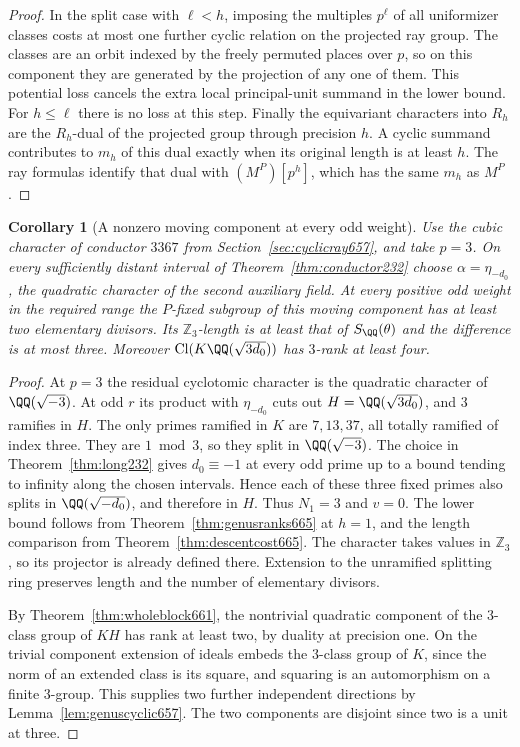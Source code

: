 \documentclass[a4paper,11pt]{article}
\newtheorem{corollary}[proposition]{Corollary}
\theoremstyle{definition}
\theoremstyle{remark}
\newcommand{\ZZ}{\mathbb Z}\newcommand{\ord}{\operatorname{ord}}
\numberwithin{equation}{section}
\newcommand{\Cl}{\operatorname{Cl}}
\begin{document}
\begin{proof}
In the split case with \(\ell<h\), imposing the multiples
\(p^\ell\) of all uniformizer classes costs at most one further
cyclic relation on the projected ray group. The classes are an
orbit indexed by the freely permuted places over \(p\), so on
this component they are generated by the projection of any
one of them. This potential loss cancels the extra local
principal-unit summand in the lower bound. For \(h\le\ell\)
there is no loss at this step. Finally the equivariant
characters into \(R_h\) are the \(R_h\)-dual of the projected
group through precision \(h\). A cyclic summand contributes
to \(m_h\) of this dual exactly when its original length is
at least \(h\). The ray formulas identify that dual with
\((M^P)[p^h]\), which has the same \(m_h\) as \(M^P\).
\end{proof}

\begin{corollary}[A nonzero moving component at every odd weight]
\leavevmode\label{cor:movingcubic665}
Use the cubic character of conductor \(3367\) from
Section~\ref{sec:cyclicray657}, and take \(p=3\).
On every sufficiently distant interval of
Theorem~\ref{thm:conductor232} choose
\(\alpha=\eta_{-d_0}\), the quadratic character of the second
auxiliary field. At every positive odd weight in the required
range the \(P\)-fixed subgroup of this moving component has
at least two elementary divisors. Its \(\ZZ_3\)-length is at
least that of \(S_{\QQ}(\theta)\) and
the difference is at most three. Moreover
\(\Cl(K\QQ(\sqrt{3d_0}))\) has \(3\)-rank at least four.
\end{corollary}
\begin{proof}
At \(p=3\) the residual cyclotomic character is the quadratic
character of \(\QQ(\sqrt{-3})\). At odd \(r\) its product with
\(\eta_{-d_0}\) cuts out \(H=\QQ(\sqrt{3d_0})\), and \(3\)
ramifies in \(H\). The only primes ramified in \(K\) are
\(7,13,37\), all totally ramified of index three. They are
\(1\bmod 3\), so they split in \(\QQ(\sqrt{-3})\).
The choice in Theorem~\ref{thm:long232} gives
\(d_0\equiv-1\) at every odd prime up to a bound tending to
infinity along the chosen intervals. Hence each of these
three fixed primes also splits in \(\QQ(\sqrt{-d_0})\), and
therefore in \(H\). Thus \(N_1=3\) and \(v=0\).
The lower bound follows from Theorem~\ref{thm:genusranks665}
at \(h=1\), and the length comparison from
Theorem~\ref{thm:descentcost665}. The character takes values
in \(\ZZ_3\), so its projector is already defined there.
Extension to the unramified splitting ring preserves length
and the number of elementary divisors.

By Theorem~\ref{thm:wholeblock661}, the nontrivial quadratic
component of the \(3\)-class group of \(KH\) has rank at least
two, by duality at precision one. On the trivial component
extension of ideals embeds the \(3\)-class group of \(K\), since
the norm of an extended class is its square, and squaring is an
automorphism on a finite \(3\)-group. This supplies two further
independent directions by Lemma~\ref{lem:genuscyclic657}.
The two components are disjoint since two is a unit at three.
\end{proof}
\end{document}
